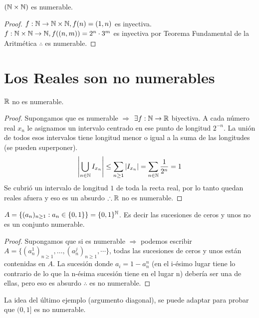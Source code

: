 \begin{eg}
    \((\mathbb{N} \times \mathbb{N})\) es numerable.
    \begin{proof}
        \(f: \mathbb{N} \to \mathbb{N}\times \mathbb{N}, f(n)=(1, n)\) es inyectiva.
        \(f: \mathbb{N}\times \mathbb{N} \to \mathbb{N} , f((n, m))= 2^n \cdot 3^m\) es inyectiva por Teorema Fundamental de la Aritmética \(\therefore \) es numerable.
    \end{proof}
\end{eg}

\section{Los Reales son no numerables}

\begin{theorem}
    \(\mathbb{R} \)  no es numerable.
    \begin{proof}
        Supongamos que es numerable \(\Rightarrow \)
        \(\exists f: \mathbb{N} \to \mathbb{R} \) biyectiva. A cada número real \(x_n\) le asignamos un intervalo centrado en ese punto de longitud \(2^{-n} \). La unión de todos esos intervalos tiene longitud menor o igual a la suma de las longitudes (se pueden superponer).
        \begin{align*}
            \left|\bigcup_{n \in \mathbb{N}} I_{x_n}\right| \leq \sum_{n \geq 1} |I_{x_n}| = \sum_{n \in \mathbb{N}}\dfrac{1}{2^n} = 1
        \end{align*}
        Se cubrió un intervalo de longitud \(1\) de toda la recta real, por lo tanto quedan reales afuera y eso es un absurdo \(\therefore \mathbb{R} \) no es numerable.
    \end{proof}
\end{theorem}

\begin{eg}
    \(A = \{ (a_n)_{n \geq 1} : a_n \in \{0, 1\}\} = \{0, 1\}^{\mathbb{N}} \). Es decir las sucesiones de ceros y unos no es un conjunto numerable.
    \begin{proof}
        Supongamos que si es numerable \(\Rightarrow \) podemos escribir \\ \(A = \{ (a_n^1)_{n\geq1}, \ldots, (a_n^j)_{n\geq1}, \cdots \} \), todas las sucesiones de ceros y unos están contenidas en \(A\). La sucesión donde \(a_i=1-a_n^n\) (en el i-ésimo lugar tiene lo contrario de lo que la n-ésima sucesión tiene en el lugar n) debería ser una de ellas, pero eso es absurdo \(\therefore \) es no numerable.
    \end{proof}
\end{eg}

La idea del último ejemplo (argumento diagonal), se puede adaptar para probar que \((0, 1] \) es no numerable.

